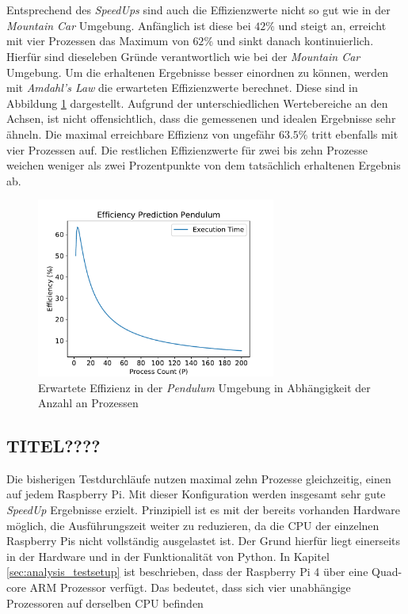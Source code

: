\\\\
Entsprechend des \emph{SpeedUps} sind auch die Effizienzwerte nicht so gut wie in der \emph{Mountain Car} Umgebung. Anfänglich ist diese bei $42\%$ und steigt an, erreicht mit vier Prozessen das Maximum von $62\%$ und sinkt danach kontinuierlich. Hierfür sind dieseleben Gründe verantwortlich wie bei der \emph{Mountain Car} Umgebung. Um die erhaltenen Ergebnisse besser einordnen zu können, werden mit \emph{Amdahl's Law} die erwarteten Effizienzwerte berechnet. Diese sind in Abbildung \ref{fig:pendulumr_efficiency_predidction} dargestellt. Aufgrund der unterschiedlichen Wertebereiche an den Achsen, ist nicht offensichtlich, dass die gemessenen und idealen Ergebnisse sehr ähneln. Die maximal erreichbare Effizienz von ungefähr $63.5\%$ tritt ebenfalls mit vier Prozessen auf. Die restlichen Effizienzwerte für zwei bis zehn Prozesse weichen weniger als zwei Prozentpunkte von dem tatsächlich erhaltenen Ergebnis ab. 
\begin{figure}[!h]
	\centering
	\includegraphics[width=0.7\textwidth]{./img/pendulum_analysis/pendulum_efficiency_prediction.pdf} 
	\caption{Erwartete Effizienz in der \emph{Pendulum} Umgebung in Abhängigkeit der Anzahl an Prozessen}
	\label{fig:pendulumr_efficiency_predidction}
\end{figure}

\subsection{TITEL????}
Die bisherigen Testdurchläufe nutzen maximal zehn Prozesse gleichzeitig, einen auf jedem Raspberry Pi. Mit dieser Konfiguration werden insgesamt sehr gute \emph{SpeedUp} Ergebnisse erzielt. Prinzipiell ist es mit der bereits vorhanden Hardware möglich, die Ausführungszeit weiter zu reduzieren, da die \ac{CPU} der einzelnen Raspberry Pis nicht vollständig ausgelastet ist. Der Grund hierfür liegt einerseits in der Hardware und in der Funktionalität von Python. In Kapitel \ref{sec:analysis_testsetup} ist beschrieben, dass der Raspberry Pi 4 über eine Quad-core ARM Prozessor verfügt. Das bedeutet, dass sich vier unabhängige Prozessoren auf derselben \ac{CPU} befinden \cite{marowka2018python}

